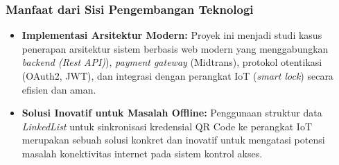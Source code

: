 \subsubsection{Manfaat dari Sisi Pengembangan Teknologi}
\begin{itemize}
    \item \textbf{Implementasi Arsitektur Modern:} Proyek ini menjadi studi kasus penerapan arsitektur sistem berbasis web modern yang menggabungkan \textit{backend (Rest API)}), \textit{payment gateway} (Midtrans), protokol otentikasi (OAuth2, JWT), dan integrasi dengan perangkat IoT (\textit{smart lock}) secara efisien dan aman.
    \item \textbf{Solusi Inovatif untuk Masalah Offline:} Penggunaan struktur data \textit{LinkedList} untuk sinkronisasi kredensial QR Code ke perangkat IoT merupakan sebuah solusi konkret dan inovatif untuk mengatasi potensi masalah konektivitas internet pada sistem kontrol akses.
\end{itemize}